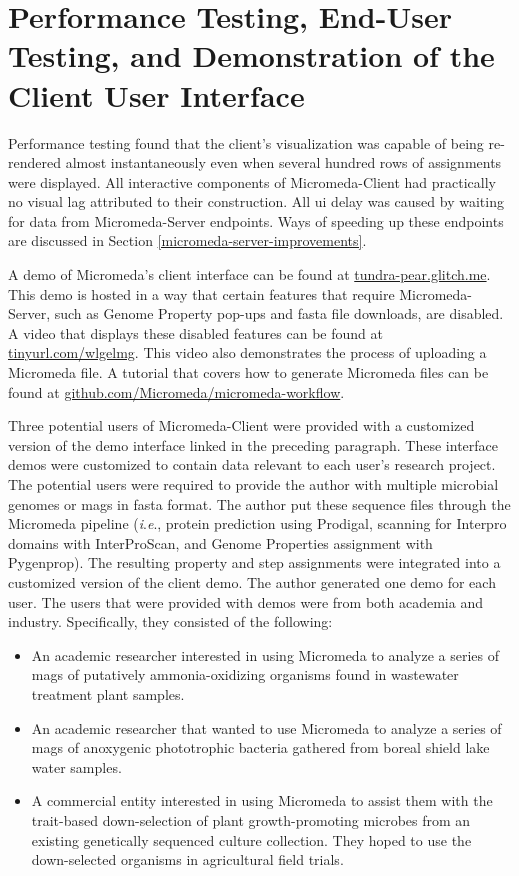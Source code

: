 \section{Performance Testing, End-User Testing, and Demonstration of the Client User Interface} \label{client-demo}

Performance testing found that the client’s visualization was capable of being 
re-rendered almost instantaneously even when several hundred rows of assignments 
were displayed. All interactive components of Micromeda-Client had practically 
no visual lag attributed to their construction. All \gls{ui} delay was caused by 
waiting for data from Micromeda-Server endpoints. Ways of speeding up these 
endpoints are discussed in Section \ref{micromeda-server-improvements}.

A demo of Micromeda’s client interface can be found at 
\href{http://tundra-pear.glitch.me}{tundra-pear.glitch.me}. This demo is hosted 
in a way that certain features that require Micromeda-Server, such as Genome 
Property pop-ups and \gls{fasta} file downloads, are disabled. A video that 
displays these disabled features can be found at 
\href{https://tinyurl.com/wlgelmg}{tinyurl.com/wlgelmg}. This video also 
demonstrates the process of uploading a Micromeda file. A tutorial 
that covers how to generate Micromeda files can be found at 
\href{https://github.com/Micromeda/micromeda-workflow}{github.com/Micromeda/micromeda-workflow}.

Three potential users of Micromeda-Client were provided with a customized 
version of the demo interface linked in the preceding paragraph. These interface 
demos were customized to contain data relevant to each user’s research project. 
The potential users were required to provide the author with multiple microbial 
genomes or \gls{mags} in \gls{fasta} format. The author put these sequence files 
through the Micromeda pipeline (\textit{i}.\textit{e}., protein prediction using 
Prodigal, scanning for Interpro domains with InterProScan, and Genome Properties 
assignment with Pygenprop). The resulting property and step assignments were 
integrated into a customized version of the client demo. The author generated 
one demo for each user.  The users that were provided with demos were from both 
academia and industry. Specifically, they consisted of the following:

\begin{itemize}
\item An academic researcher interested in using Micromeda to analyze a series 
of \gls{mags} of putatively ammonia-oxidizing organisms found in wastewater 
treatment plant samples.
\item An academic researcher that wanted to use Micromeda to analyze a series of 
\gls{mags} of anoxygenic phototrophic bacteria gathered from boreal shield lake 
water samples.
\item A commercial entity interested in using Micromeda to assist them with the 
trait-based down-selection of plant growth-promoting microbes from an existing 
genetically sequenced culture collection. They hoped to use the down-selected 
organisms in agricultural field trials.
\end{itemize}

